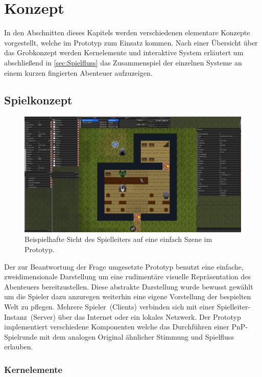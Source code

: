 \chapter{Konzept}
\label{concept}
In den Abschnitten dieses Kapitels werden verschiedenen elementare Konzepte vorgestellt, welche im Prototyp zum Einsatz kommen. Nach einer Übersicht über das Grobkonzept werden Kernelemente und interaktive System erläutert um abschließend in \ref{sec:Spielfluss} das Zusammenspiel der einzelnen Systeme an einem kurzen fingierten Abenteuer aufzuzeigen.

\section{Spielkonzept}
\label{sec:Grobkonzept}

\begin{figure}[h]
	\includegraphics[width=\textwidth]{media/prototype}
	\caption{Beispielhafte Sicht des Spielleiters auf eine einfach Szene im Prototyp.}
\end{figure}

Der zur Beantwortung der Frage umgesetzte Prototyp benutzt eine einfache, zweidimensionale Darstellung um eine rudimentäre visuelle Repräsentation des Abenteuers bereitzustellen. Diese abstrakte Darstellung wurde bewusst gewählt um die Spieler dazu anzuregen weiterhin eine eigene Vorstellung der bespielten Welt zu pflegen. Mehrere Spieler~(Clients) verbinden sich mit einer Spielleiter-Instanz~(Server) über das Internet oder ein lokales Netzwerk. Der Prototyp implementiert verschiedene Komponenten welche das Durchführen einer PnP-Spielrunde mit dem analogen Original ähnlicher Stimmung und Spielfluss erlauben.



\subsection{Kernelemente}

